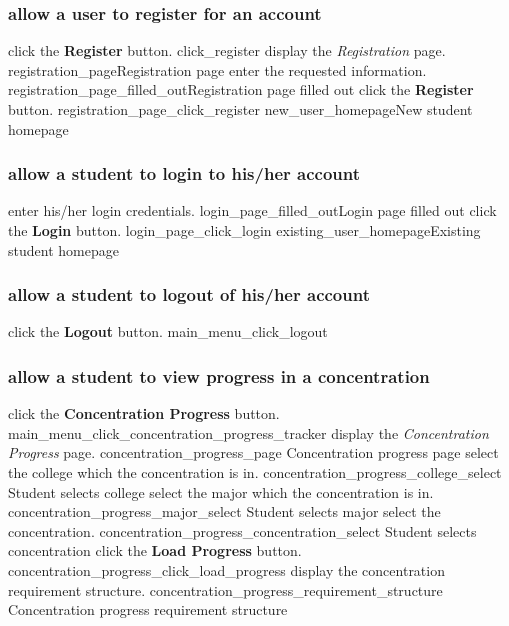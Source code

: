 \documentclass[12pt]{article}
\newenvironment{requirement}[1]
{
    \renewcommand{\thesubsubsection}{R\arabic{subsubsection}.}
    \renewcommand{\labelenumi}{
        \arabic{subsubsection}.\arabic{enumi}
    }
    \renewcommand{\labelenumii}{
        \arabic{subsubsection}.\arabic{enumi}.\arabic{enumii}
    }
    \renewcommand{\labelenumiii}{
        \arabic{subsubsection}.\arabic{enumi}.\arabic{enumii}.\arabic{enumiii}
    }
    \renewcommand{\labelenumiv}{
        \arabic{subsubsection}.\arabic{enumi}.\arabic{enumii}.\arabic{enumiii}.\arabic{enumiv}
    }
    \subsubsection{#1}
    \begin{enumerate}
}
{
    \end{enumerate}
}
\begin{document}
\begin{requirement}{\sysshall allow a user to register for an account}
    \loginpage
    \screenshotstep
      {\usershall click the \textbf{Register} button.}
      {click_register}{}
    \screenshotstep
      {\sysshall display the \emph{Registration} page.}
      {registration_page}{Registration page}
    \screenshotstep
      {\usershall enter the requested information.}
      {registration_page_filled_out}{Registration page filled out}
    \screenshotstep
      {\usershall click the \textbf{Register} button.}
      {registration_page_click_register}{}
    \screenshotstep
      {\redirecthome}
      {new_user_homepage}{New student homepage}
\end{requirement}

\begin{requirement}{\sysshall allow a student to login to his/her account}
    \loginpage
    \screenshotstep
      {\stushall enter his/her login credentials.}
      {login_page_filled_out}{Login page filled out}
    \screenshotstep
      {\stushall click the \textbf{Login} button.}
      {login_page_click_login}{}
    \screenshotstep
      {\redirecthome}
      {existing_user_homepage}{Existing student homepage}
\end{requirement}

\begin{requirement}{\sysshall allow a student to logout of his/her account}
    \mainmenu
    \screenshotstep
      {\stushall click the \textbf{Logout} button.}
      {main_menu_click_logout}{}
    \loginpage
\end{requirement}

\begin{requirement}{\sysshall allow a student to view progress in a concentration}
    \mainmenu
    \screenshotstep
      {\stushall click the \textbf{Concentration Progress} button.}
      {main_menu_click_concentration_progress_tracker}
      {}
    \screenshotstep
      {\sysshall display the \emph{Concentration Progress} page.}
      {concentration_progress_page}
      {Concentration progress page}
    \screenshotstep
      {\stushall select the college which the concentration is in.}
      {concentration_progress_college_select}
      {Student selects college}
    \screenshotstep
      {\stushall select the major which the concentration is in.}
      {concentration_progress_major_select}
      {Student selects major}
    \screenshotstep
      {\stushall select the concentration.}
      {concentration_progress_concentration_select}
      {Student selects concentration}
    \screenshotstep
      {\stushall click the \textbf{Load Progress} button.}
      {concentration_progress_click_load_progress}
      {}
    \screenshotstep
      {\sysshall display the concentration requirement structure.}
      {concentration_progress_requirement_structure}
      {Concentration progress requirement structure}
\end{requirement}
\end{document}
